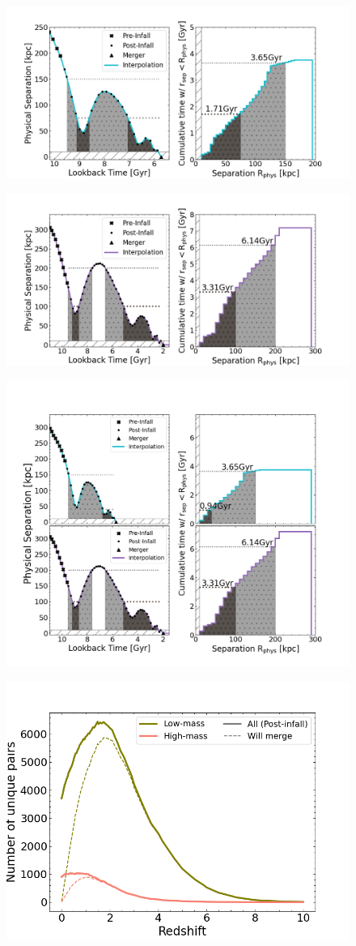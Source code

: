 \documentclass[twocolumn]{aastex631}
\begin{document}
\appendix
\begin{figure}[htb]
    \centering
    \includegraphics[width=0.5\columnwidth]{plots/bet-on-it/4_example1.png}
\end{figure}
\begin{figure}[htb]
    \centering
    \includegraphics[width=0.5\columnwidth]{plots/bet-on-it/4_example2.png}
    \caption{}
\end{figure}
\begin{figure}[htb]
    \centering
    \includegraphics[width=0.5\columnwidth]{plots/bet-on-it/4_examplecombo.png}
\end{figure}
\begin{figure}[htb]
    \centering
    \includegraphics[width=0.5\columnwidth]{plots/bet-on-it/3_number_pairs.png}
\end{figure}
\end{document}
